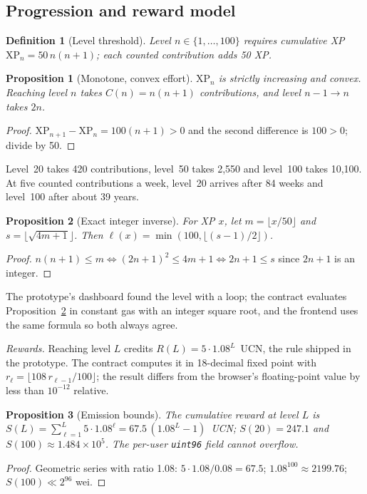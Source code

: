 \documentclass[conference]{IEEEtran}
\newtheorem{proposition}{Proposition}
\newtheorem{definition}{Definition}
\newcommand{\XP}{\mathrm{XP}}
\begin{document}
\subsection{Progression and reward model}\label{sec:math}

\begin{definition}[Level threshold]
Level $n \in \{1,\dots,100\}$ requires cumulative XP $\XP_n = 50\,n(n+1)$; each counted contribution adds 50 XP.
\end{definition}

\begin{proposition}[Monotone, convex effort]\label{prop:mono}
$\XP_n$ is strictly increasing and convex. Reaching level $n$ takes $C(n) = n(n+1)$ contributions, and level $n-1 \to n$ takes $2n$.
\end{proposition}
\begin{proof}
$\XP_{n+1} - \XP_n = 100(n+1) > 0$ and the second difference is $100 > 0$; divide by 50.
\end{proof}
Level~20 takes 420 contributions, level~50 takes 2{,}550 and level~100 takes 10{,}100. At five counted contributions a week, level~20 arrives after 84 weeks and level~100 after about 39 years.

\begin{proposition}[Exact integer inverse]\label{prop:inverse}
For XP $x$, let $m = \lfloor x/50 \rfloor$ and $s = \lfloor \sqrt{4m+1} \rfloor$. Then $\ell(x) = \min(100, \lfloor (s-1)/2 \rfloor)$.
\end{proposition}
\begin{proof}
$n(n+1) \le m \iff (2n+1)^2 \le 4m+1 \iff 2n+1 \le s$ since $2n+1$ is an integer.
\end{proof}
The prototype's dashboard found the level with a loop; the contract evaluates Proposition~\ref{prop:inverse} in constant gas with an integer square root, and the frontend uses the same formula so both always agree.

\textit{Rewards.} Reaching level $L$ credits $R(L) = 5 \cdot 1.08^{L}$~UCN, the rule shipped in the prototype. The contract computes it in 18-decimal fixed point with $r_\ell = \lfloor 108\,r_{\ell-1}/100 \rfloor$; the result differs from the browser's floating-point value by less than $10^{-12}$ relative.

\begin{proposition}[Emission bounds]\label{prop:emission}
The cumulative reward at level $L$ is $S(L) = \sum_{\ell=1}^{L} 5 \cdot 1.08^{\ell} = 67.5\,(1.08^{L} - 1)$~UCN; $S(20) = 247.1$ and $S(100) \approx 1.484 \times 10^{5}$. The per-user \texttt{uint96} field cannot overflow.
\end{proposition}
\begin{proof}
Geometric series with ratio 1.08: $5 \cdot 1.08 / 0.08 = 67.5$; $1.08^{100} \approx 2199.76$; $S(100) \ll 2^{96}$ wei.
\end{proof}
\end{document}

